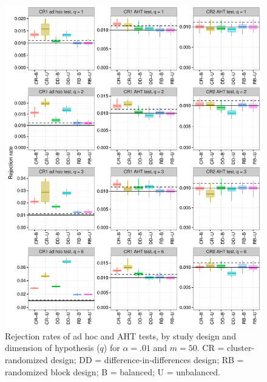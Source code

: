 \documentclass{article}\usepackage[]{graphicx}\usepackage[]{color}
\newenvironment{knitrout}{}{} %
\begin{document}
\begin{knitrout}
\color{fgcolor}\begin{figure}[H]

{\centering \includegraphics[width=\linewidth]{CR_fig/balance_01_50-1} 

}

\caption[Rejection rates of ad hoc and AHT tests, by study design and dimension of hypothesis (]{Rejection rates of ad hoc and AHT tests, by study design and dimension of hypothesis ($q$) for $\alpha = .01$ and $m = 50$. CR = cluster-randomized design; DD = difference-in-differences design; RB = randomized block design; B = balanced; U = unbalanced.}\label{fig:balance_01_50}
\end{figure}


\end{knitrout}
\end{document}
